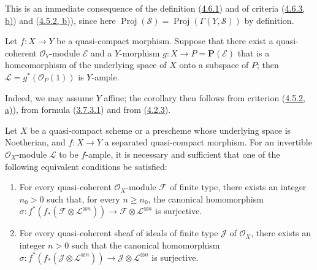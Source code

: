 This is an immediate consequence of the definition
(\hyperref[II.4.6.1]{4.6.1}) and of criteria
(\hyperref[II.4.6.3]{4.6.3, b)}) and
(\hyperref[II.4.5.2]{4.5.2, b)}), since here
$\operatorname{Proj}(\mathcal{S})
=\operatorname{Proj}(\Gamma(Y,\mathcal{S}))$ by definition.

\begin{corollary}[4.6.7]
\label{II.4.6.7}
Let $f:X\to Y$ be a quasi-compact morphism. Suppose that there exist a
quasi-coherent $\mathcal{O}_Y$-module $\mathcal{E}$ and a $Y$-morphism
$g:X\to P=\mathbf{P}(\mathcal{E})$ that is a homeomorphism of the underlying
space of $X$ onto a subspace of $P$; then
$\mathcal{L}=g^*(\mathcal{O}_P(1))$ is $Y$-ample.
\end{corollary}

Indeed, we may assume $Y$ affine; the corollary then follows from
criterion (\hyperref[II.4.5.2]{4.5.2, a)}), from formula
(\hyperref[II.3.7.3.1]{3.7.3.1}) and from
(\hyperref[II.4.2.3]{4.2.3}).

\begin{proposition}[4.6.8]
\label{II.4.6.8}
Let $X$ be a quasi-compact scheme or a prescheme whose underlying
space is Noetherian, and $f:X\to Y$ a separated quasi-compact morphism.
For an invertible $\mathcal{O}_X$-module $\mathcal{L}$ to be $f$-ample,
it is necessary and sufficient that one of the following equivalent conditions be
satisfied:
\begin{enumerate}
  \item[\rm{c)}] For every quasi-coherent $\mathcal{O}_X$-module
  $\mathcal{F}$ of finite type, there exists an integer $n_0>0$ such that, for
  every $n\geq n_0$, the canonical homomorphism
  $\sigma:f^*(f_*(\mathcal{F}\otimes\mathcal{L}^{\otimes n}))\to
  \mathcal{F}\otimes\mathcal{L}^{\otimes n}$ is surjective.
  \item[\rm{c')}] For every quasi-coherent sheaf of ideals of finite type
  $\mathcal{J}$ of $\mathcal{O}_X$, there exists an integer $n>0$ such that
  the canonical homomorphism
  $\sigma:f^*(f_*(\mathcal{J}\otimes\mathcal{L}^{\otimes n}))\to
  \mathcal{J}\otimes\mathcal{L}^{\otimes n}$ is surjective.
\end{enumerate}
\end{proposition}

